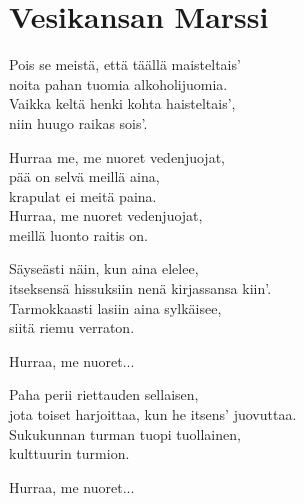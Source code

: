 \section{Vesikansan Marssi}

Pois se meistä, että täällä maisteltais'\\
noita pahan tuomia alkoholijuomia.\\
Vaikka keltä henki kohta haisteltais',\\
niin huugo raikas sois'.

Hurraa me, me nuoret vedenjuojat,\\
pää on selvä meillä aina,\\
krapulat ei meitä paina.\\
Hurraa, me nuoret vedenjuojat,\\
meillä luonto raitis on.

Säyseästi näin, kun aina elelee,\\
itseksensä hissuksiin nenä kirjassansa kiin'.\\
Tarmokkaasti lasiin aina sylkäisee,\\
siitä riemu verraton.

Hurraa, me nuoret...

Paha perii riettauden sellaisen,\\
jota toiset harjoittaa, kun he itsens' juovuttaa.\\
Sukukunnan turman tuopi tuollainen,\\
kulttuurin turmion.

Hurraa, me nuoret...